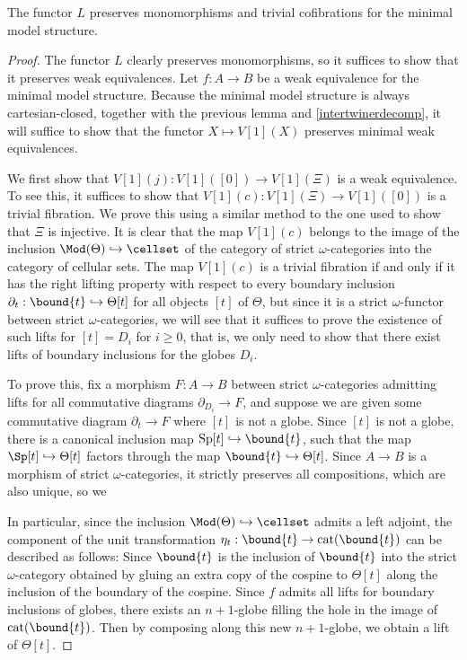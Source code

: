 \begin{prop}
The functor \(L\) preserves monomorphisms and trivial cofibrations for the minimal model structure.
\end{prop}
\begin{proof}  
The functor \(L\) clearly preserves monomorphisms, so it suffices to show that it preserves weak equivalences.  Let \(f:A\to B\) be a weak equivalence for the minimal model structure.  Because the minimal model structure is always cartesian-closed, together with the previous lemma and \eqref{intertwinerdecomp}, it will suffice to show that the functor \(X\mapsto V[1](X)\) preserves minimal weak equivalences.  

We first show that \(V[1](j): V[1]([0])\to V[1](\Xi)\) is a weak equivalence.  To see this, it suffices to show that \(V[1](c):V[1](\Xi)\to V[1]([0])\) is a trivial fibration.  We prove this using a similar method to the one used to show that \(\Xi\) is injective.  It is clear that the map \(V[1](c)\) belongs to the image of the inclusion \(\Mod(\Theta)\hookrightarrow \cellset\) of the category of strict \(\omega\)-categories into the category of cellular sets.  The map \(V[1](c)\) is a trivial fibration if and only if it has the right lifting property with respect to every boundary inclusion \(\partial_t:\bound{t}\hookrightarrow \Theta[t]\) for all objects \([t]\) of \(\Theta\), but since it is a strict \(\omega\)-functor between strict \(\omega\)-categories, we will see that it suffices to prove the existence of such lifts for \([t]=D_i\) for \(i\geq 0\), that is, we only need to show that there exist lifts of boundary inclusions for the globes \(D_i\).  

To prove this, fix a morphism \(F:A\to B\) between strict \(\omega\)-categories admitting lifts for all commutative diagrams \(\partial_{D_i}\to F\), and suppose we are given some commutative diagram \(\partial_t\to F\) where \([t]\) is not a globe.  Since \([t]\) is not a globe, there is a canonical inclusion map \(\operatorname{Sp}[t]\hookrightarrow \bound{t}\), such that the map \(\Sp[t]\hookrightarrow \Theta[t]\) factors through the map \(\bound{t}\hookrightarrow \Theta[t]\).  Since \(A\to B\) is a morphism of strict \(\omega\)-categories, it strictly preserves all compositions, which are also unique, so we 

In particular, since the inclusion \(\Mod(\Theta)\hookrightarrow \cellset\) admits a left adjoint, the component of the unit transformation \(\eta_t: \bound{t}\to \operatorname{cat}(\bound{t})\) can be described as follows: Since \(\bound{t}\)  is the inclusion of \(\bound{t}\) into the strict \(\omega\)-category obtained by gluing an extra copy of the cospine to \(\Theta[t]\) along the inclusion of the boundary of the cospine.  Since \(f\) admits all lifts for boundary inclusions of globes, there exists an \(n+1\)-globe filling the hole in the image of \(\operatorname{cat}(\bound{t})\). Then by composing along this new \(n+1\)-globe, we obtain a lift of \(\Theta[t]\).  


\end{proof}
